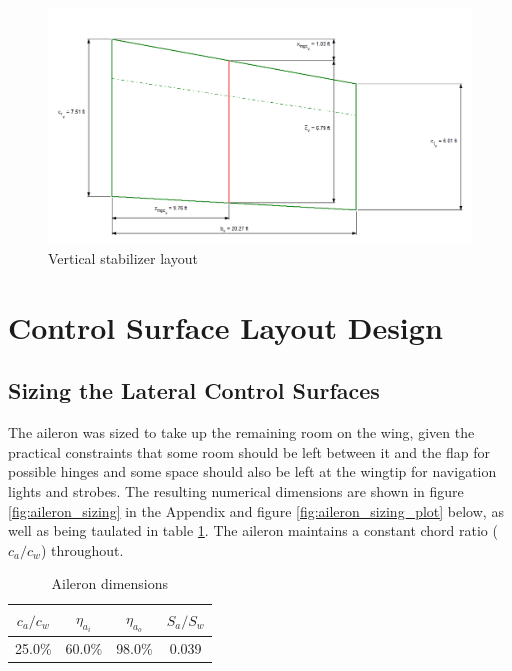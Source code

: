 \documentclass[conf]{new-aiaa}
\begin{document}
\begin{figure}[H]
    \includegraphics[width=\textwidth]{Report3Printouts/Empannage/Vertical_geometry_plot.png}
    \caption{Vertical stabilizer layout}
    \label{fig:vertical_geometry_plot}
\end{figure}


\section{Control Surface Layout Design}
\subsection{Sizing the Lateral Control Surfaces}

The aileron was sized to take up the remaining room on the wing, given the practical constraints that some room should be left between it and the flap for possible hinges and some space should also be left at the wingtip for navigation lights and strobes. The resulting numerical dimensions are shown in figure \ref{fig:aileron_sizing} in the Appendix and figure \ref{fig:aileron_sizing_plot} below, as well as being taulated in table \ref{tab:aileron_size_table}. The aileron maintains a constant chord ratio ($c_a/c_w$) throughout.

\begin{table}[H]
\centering
\caption{Aileron dimensions}
\begin{tabular}{|c|c|c|c|}\hline
    $c_a/c_w$ & $\eta_{a_i}$ & $\eta_{a_o}$ & $S_a/S_w$ \\ \hline
    25.0\%    & 60.0\%     & 98.0\%     & 0.039     \\ \hline
\end{tabular}
\label{tab:aileron_size_table}
\end{table}
\end{document}
